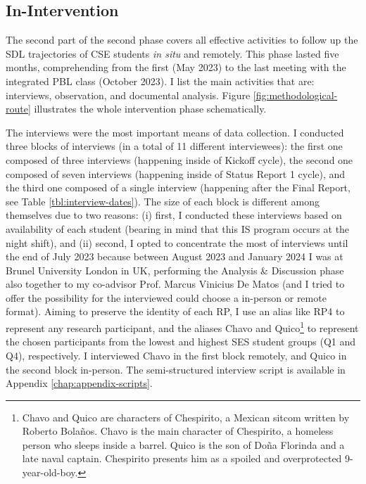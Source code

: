         


\subsection{In-Intervention}
\label{phd-route-ss:in-int}

The second part of the second phase covers all effective activities to follow up the \gls{SDL} trajectories of \gls{CSE} students \textit{in situ} and remotely. This phase lasted five months, comprehending from the first (May 2023) to the last meeting with the integrated \gls{PBL} class (October 2023). I list the main activities that are: interviews, observation, and documental analysis. Figure \ref{fig:methodological-route} illustrates the whole intervention phase schematically. 

The interviews were the most important means of data collection. I conducted three blocks of interviews (in a total of 11 different interviewees): the first one composed of three interviews (happening inside of Kickoff cycle), the second one composed of seven interviews (happening inside of Status Report 1 cycle), and the third one composed of a single interview (happening after the Final Report, see Table \ref{tbl:interview-dates}). The size of each block is different among themselves due to two reasons: (i) first, I conducted these interviews based on availability of each student (bearing in mind that this \gls{IS} program occurs at the night shift), and (ii) second, I opted to concentrate the most of interviews until the end of July 2023 because between August 2023 and January 2024 I was at Brunel University London in \gls{UK}, performing the Analysis \& Discussion phase also together to my co-advisor Prof. Marcus Vinicius De Matos (and I tried to offer the possibility for the interviewed could choose a in-person or remote format). Aiming to preserve the identity of each \gls{RP}, I use an alias like \gls{RP}4 to represent any research participant, and the aliases Chavo and Quico\footnote{Chavo and Quico are characters of Chespirito, a Mexican sitcom written by Roberto Bolaños. Chavo is the main character of Chespirito, a homeless person who sleeps inside a barrel. Quico is the son of Doña Florinda and a late naval captain. Chespirito presents him as a spoiled and overprotected 9-year-old-boy.} to represent the chosen participants from the lowest and highest \gls{SES} student groups (\gls{Q}1 and \gls{Q}4), respectively. I interviewed Chavo in the first block remotely, and Quico in the second block in-person. The semi-structured interview script is available in Appendix \ref{chap:appendix-scripts}.

